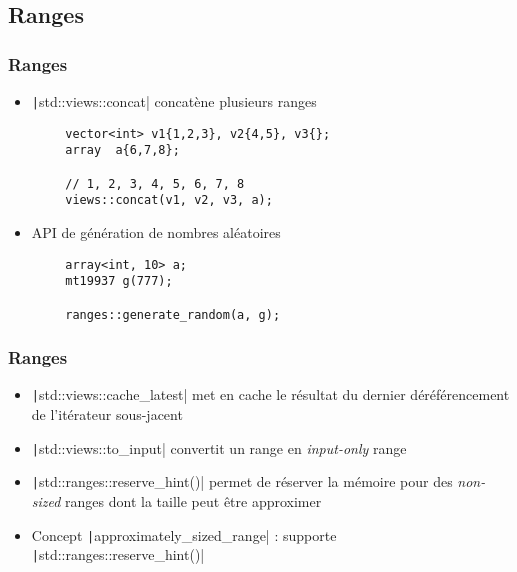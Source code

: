 \documentclass[C++.tex]{subfiles}
\begin{document}
\subsection*{Ranges}
\begin{frame}[fragile]
	\frametitle{Ranges}
	\begin{itemize}
		\item \texttt|std::views::concat| concatène plusieurs ranges
	\end{itemize}

	\begin{verbatim}
		vector<int> v1{1,2,3}, v2{4,5}, v3{};
		array  a{6,7,8};

		// 1, 2, 3, 4, 5, 6, 7, 8
		views::concat(v1, v2, v3, a);
	\end{verbatim}

	\begin{itemize}
		\item API de génération de nombres aléatoires
	\end{itemize}

	\begin{verbatim}
		array<int, 10> a;
		mt19937 g(777);

		ranges::generate_random(a, g);
	\end{verbatim}

\end{frame}

\begin{frame}[fragile]
	\frametitle{Ranges}
	\begin{itemize}
		\item \texttt|std::views::cache_latest| met en cache le résultat du dernier déréférencement de l'itérateur sous-jacent
		\item \texttt|std::views::to_input| convertit un range en \textit{input-only} range
		\item \texttt|std::ranges::reserve_hint()| permet de réserver la mémoire pour des \textit{non-sized} ranges dont la taille peut être approximer
		\item Concept \texttt|approximately_sized_range| : supporte \texttt|std::ranges::reserve_hint()|
	\end{itemize}

\end{frame}
\end{document}

